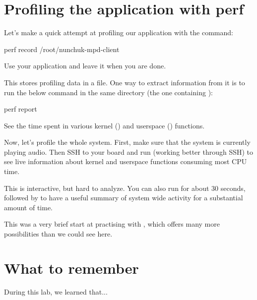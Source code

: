 \section{Profiling the application with perf}

Let's make a quick attempt at profiling our application with the
 command:

\begin{bashinput}
perf record /root/nunchuk-mpd-client
\end{bashinput}

Use your application and leave it when you are done.

This stores profiling data in a  file. One way to
extract information from it is to run the below command in the same
directory (the one containing ):

\begin{bashinput}
perf report
\end{bashinput}

See the time spent in various kernel (\code{[k]}) and userspace
(\code{[.]}) functions.

Now, let's profile the whole system. First, make sure that the system is
currently playing audio. Then SSH to your board and run 
(working better through SSH) to see live information about kernel and
userspace functions consuming most CPU time.

This is interactive, but hard to analyze. You can also run  for about 30 seconds, followed by  to have
a useful summary of system wide activity for a substantial amount of time.

This was a very brief start at practising with , which offers
many more possibilities than we could see here.

\section{What to remember}

During this lab, we learned that...

